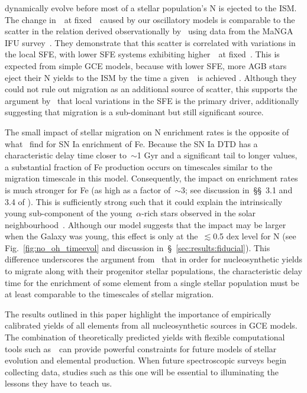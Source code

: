 \documentclass[ms.tex]{subfiles}
\begin{document}
dynamically evolve before most of a stellar population's N is ejected to the
ISM.
The change in~\no~at fixed~\oh~caused by our oscillatory models is comparable
to the scatter in the relation derived observationally by~\citet{Schaefer2020}
using data from the MaNGA IFU survey~\citep{Bundy2015}.
They demonstrate that this scatter is correlated with variations in the local
SFE, with lower SFE systems exhibiting higher~\no~at fixed~\oh.
This is expected from simple GCE models, because with lower SFE, more AGB stars
eject their N yields to the ISM by the time a given~\oh~is achieved
\citep[e.g.][]{Molla2006, Vincenzo2016a}.
Although they could not rule out migration as an additional source of scatter,
this supports the argument by~\citet{Schaefer2020} that local variations in the
SFE is the primary driver, additionally suggesting that migration is a
sub-dominant but still significant source.
\par
The small impact of stellar migration on N enrichment rates is the opposite of
what~\citet{Johnson2021} find for SN Ia enrichment of Fe.
Because the SN Ia DTD has a characteristic delay time closer to~$\sim$1 Gyr
and a significant tail to longer values, a substantial fraction of Fe
production occurs on timescales similar to the migration timescale in this
model.
Consequently, the impact on enrichment rates is much stronger for Fe (as high
as a factor of~$\sim$3; see discussion in~\S\S~3.1 and 3.4 of
\citealp{Johnson2021}).
This is sufficiently strong such that it could explain the intrinsically young
sub-component of the young~$\alpha$-rich stars observed in the solar
neighbourhood~\citep{Chiappini2015, Martig2015, Martig2016, Jofre2016,
Yong2016, Izzard2018, SilvaAguirre2018, Warfield2021}.
Although our model suggests that the impact may be larger when the Galaxy was
young, this effect is only at the~$\lesssim$0.5 dex level for N (see
Fig.~\ref{fig:no_oh_timeevol} and discussion in~\S~\ref{sec:results:fiducial}).
This difference underscores the argument from~\citet{Johnson2021} that in order
for nucleosynthetic yields to migrate along with their progenitor stellar
populations, the characteristic delay time for the enrichment of some element
from a single stellar population must be at least comparable to the timescales
of stellar migration.
\par
The results outlined in this paper highlight the importance of empirically
calibrated yields of all elements from all nucleosynthetic sources in GCE
models.
The combination of theoretically predicted yields with flexible computational
tools such as~\vice~can provide powerful constraints for future models of
stellar evolution and elemental production.
When future spectroscopic surveys begin collecting data, studies such as this
one will be essential to illuminating the lessons they have to teach us.
\end{document}

